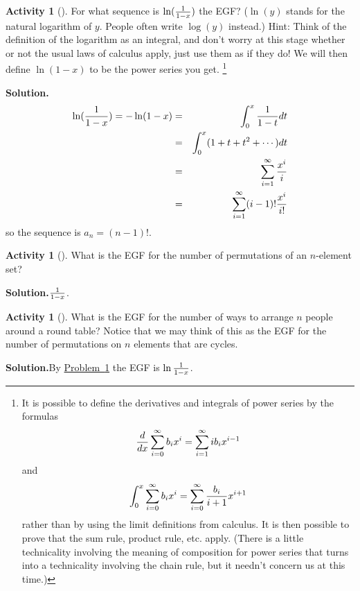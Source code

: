\documentclass[10pt,]{book}
\theoremstyle{plain}
\theoremstyle{definition}
\newtheorem{activity}[project]{Activity}
\numberwithin{equation}{chapter}
\newcommand{\amp}{&}
\begin{document}
\begin{activity}[]\label{ln1over1-x}
For what sequence is \(\ln({1\over 1-x})\) the EGF? (\(\ln (y)\) stands for the natural logarithm of \(y\). People often write \(\log(y)\) instead.) Hint: Think of the definition of the logarithm as an integral, and don't worry at this stage whether or not the usual laws of calculus apply, just use them as if they do! We will then define \(\ln({ 1-x})\) to be the power series you get. \footnote{It is possible to define the derivatives and integrals of power series by the formulas%
\begin{equation*}
{d\over dx}
\sum_{i=0}^\infty b_ix^i = \sum_{i=1}^\infty ib_ix^{i-1}
\end{equation*}
and%
\begin{equation*}
\int_0^x
\sum_{i=0}^\infty b_ix^i = \sum_{i=0}^\infty {b_i\over i+1}x^{i+1}
\end{equation*}
rather than by using the limit definitions from calculus.  It is then possible to prove that the sum rule, product rule, etc. apply.  (There is a little technicality involving the meaning of composition for power series that turns into a technicality involving the chain rule, but it needn't concern us at this time.)\label{fn-5}}%
\par\medskip\noindent%
\textbf{Solution.}\quad %
\begin{align*}
\ln({1\over 1-x}) =-\ln(1-x) \amp =\amp 
\int_0^x {1\over 1-t}dt\\
\amp =\amp \int_0^x (1+t+t^2+\cdots)dt\\
\amp =\amp \sum_{i=1}^\infty {x^i\over i}\\
\amp =\amp  \sum_{i=1}^\infty (i-1)!{x^i\over
i!}
\end{align*}
so the sequence is \(a_n = (n-1)!\).%
\end{activity}
\begin{activity}[]\label{exponentialpermutations}
What is the EGF for the number of permutations of an \(n\)-element set?%
\par\medskip\noindent%
\textbf{Solution.}\quad \(1\over 1-x\).%
\end{activity}
\begin{activity}[]\label{exponentialroundtable}
What is the EGF for the number of ways to arrange \(n\) people around a round table? Notice that we may think of this as the EGF for the number of permutations on \(n\) elements that are cycles.%
\par\medskip\noindent%
\textbf{Solution.}\quad By \hyperref[ln1over1-x]{Problem~\ref{ln1over1-x}} the EGF is \(\ln{1\over 1-x}\).%
\end{activity}
\end{document}
